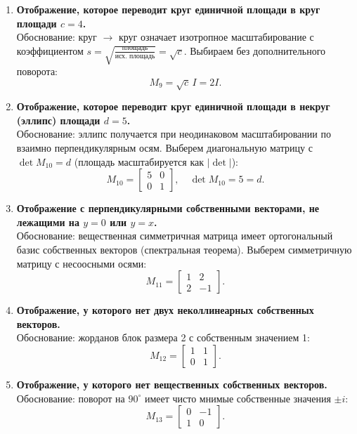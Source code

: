 \begin{enumerate}
  \item \textbf{Отображение, которое переводит круг единичной площади в круг площади $c = 4$.}\\
  Обоснование: круг $\to$ круг означает изотропное масштабирование с коэффициентом $s=\sqrt{\tfrac{\text{площадь}}{\text{исх. площадь}}}=\sqrt{c}$. Выбираем без дополнительного поворота:
  \[
    M_9 = \sqrt{c}\,I = 2I.
  \]

  \item \textbf{Отображение, которое переводит круг единичной площади в некруг (эллипс) площади $d = 5$.}\\
  Обоснование: эллипс получается при неодинаковом масштабировании по взаимно перпендикулярным осям. Выберем диагональную матрицу с $\det M_{10}=d$ (площадь масштабируется как $|\det|$):
  \[
    M_{10} = \begin{bmatrix} 5 & 0 \\ 0 & 1 \end{bmatrix},\quad \det M_{10}=5=d.
  \]

  \item \textbf{Отображение с перпендикулярными собственными векторами, не лежащими на $y = 0$ или $y = x$.}\\
  Обоснование: вещественная симметричная матрица имеет ортогональный базис собственных векторов (спектральная теорема). Выберем симметричную матрицу с несоосными осями:
  \[
    M_{11} = \begin{bmatrix} 1 & 2 \\ 2 & -1 \end{bmatrix}.
  \]

  \item \textbf{Отображение, у которого нет двух неколлинеарных собственных векторов.}\\
  Обоснование: жорданов блок размера 2 с собственным значением 1:
  \[
    M_{12} = \begin{bmatrix} 1 & 1 \\ 0 & 1 \end{bmatrix}.
  \]

  \item \textbf{Отображение, у которого нет вещественных собственных векторов.}\\
  Обоснование: поворот на $90^\circ$ имеет чисто мнимые собственные значения $\pm i$:
  \[
    M_{13} = \begin{bmatrix} 0 & -1 \\ 1 & 0 \end{bmatrix}.
  \]


\end{enumerate}
